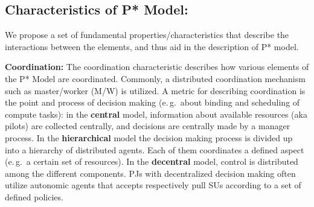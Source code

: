 \documentclass[conference,final]{IEEEtran}
\newcommand{\alnote}[1]{ {\textcolor{blue} { ***andre: #1 }}}
\newcommand{\alnote}[1]{}
\newcommand{\upp}{\vspace*{-0.5em}}
\begin{document}
\subsection{Characteristics of P* Model:\upp\upp}
\label{sec:p_star_elements}

We propose a set of fundamental properties/characteristics that
describe the interactions between the elements, and thus aid in the
description of P* model.



\textbf{Coordination:} The coordination characteristic describes how
various elements of the P* Model are coordinated.
Commonly, a distributed coordination mechanism such as master/worker
(M/W) is utilized. A metric for describing coordination is the point and
process of decision making (e.\,g.\ about binding and
scheduling of compute tasks): in the \textbf{central} model,
information about available resources (aka pilots) are collected
centrally, and decisions are centrally made by a manager
process. %
In the \textbf{hierarchical} model the decision making process is
divided up into a hierarchy of distributed agents. Each of them
coordinates a defined aspect (e.\,g.\ a certain set of resources). In
the \textbf{decentral} model, control is distributed among the
different components.  PJs with decentralized decision making often
utilize autonomic agents that accepts respectively pull SUs according
to a set of defined policies.



% 
\end{document}
